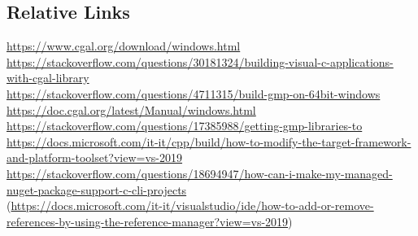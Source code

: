 \documentclass[10pt, english, openany]{report}
\begin{document}
\begin{appendices}
\subsection{Relative Links}
\href{https://www.cgal.org/download/windows.html}{https://www.cgal.org/download/windows.html}\\
\href{https://stackoverflow.com/questions/30181324/building-visual-c-applications-with-cgal-library}{https://stackoverflow.com/questions/30181324/building-visual-c-applications-with-cgal-library}\\
\href{https://stackoverflow.com/questions/4711315/build-gmp-on-64bit-windows}{https://stackoverflow.com/questions/4711315/build-gmp-on-64bit-windows}\\
\href{https://doc.cgal.org/latest/Manual/windows.html}{https://doc.cgal.org/latest/Manual/windows.html}\\
\href{https://stackoverflow.com/questions/17385988/getting-gmp-libraries-to}{https://stackoverflow.com/questions/17385988/getting-gmp-libraries-to}\\
\href{https://docs.microsoft.com/it-it/cpp/build/how-to-modify-the-target-framework-and-platform-toolset?view=vs-2019}{https://docs.microsoft.com/it-it/cpp/build/how-to-modify-the-target-framework-and-platform-toolset?view=vs-2019}\\
\href{https://stackoverflow.com/questions/18694947/how-can-i-make-my-managed-nuget-package-support-c-cli-projects}{https://stackoverflow.com/questions/18694947/how-can-i-make-my-managed-nuget-package-support-c-cli-projects}\\
(\href{https://docs.microsoft.com/it-it/visualstudio/ide/how-to-add-or-remove-references-by-using-the-reference-manager?view=vs-2019}{https://docs.microsoft.com/it-it/visualstudio/ide/how-to-add-or-remove-references-by-using-the-reference-manager?view=vs-2019})\\
	\end{appendices}
	

	
	
\end{document}
